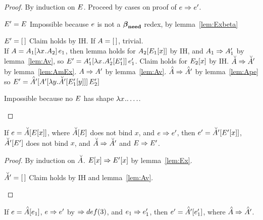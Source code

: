 \documentclass{article}
\begin{document}
\begin{proof}
By induction on $\E$. Proceed by cases on proof of $\e \pstep \e'$.
\begin{byCases}
   $\E' = \E$ 
  Impossible because $\e$ is not a $\betaneednr$ redex, by 
  lemma~\ref{lem:Exbeta} 
  \begin{byCases}
    \renewcommand{\byCasesCaseTemplate}[1]{\textbf{Subcase {#1}.}}
    \case{\E = \hole} $\E' = \hole$
     Claim holds by IH.
    If $\A = \hole$, trivial.\\
    If $\A = \ap{\inA[_1]{\lx\A_2}}{\e_1}$, then lemma holds for 
    $\inA[_2]{\Ex[_1]}$ by IH, and $\A_1 \pstep \A_1'$ by 
    lemma~\ref{lem:Av}, so $\E' = \ap{\inA[_1']{\lx\inA[_2']{\E_1'}}}{\e_1'}$.
    Claim holds for $\Ex[_2]$ by IH. $\Am \pstep \Am'$ by lemma~\ref{lem:AmEx}.
    $\A \pstep \A'$ by lemma~\ref{lem:Av}.
     $\Ap \pstep \Ap'$ by lemma~\ref{lem:Ape} so 
      $\E' = \inAp[']{\ap{\inA[']{\ly\inAm[']{\inE[_1']{y}}}}{\E_2'}}$
  \end{byCases}
  Impossible because no $\E$ has shape $\lx.\ldots$.
\end{byCases}
\end{proof}


\begin{lemma}
\label{lem:AmEx}
If $\e = \inAm{\Ex}$, where $\inAm{\E}$ does not bind $x$, and $\e \pstep \e'$,
then $\e' = \inAm[']{\Ex[']}$, $\inAm[']{\E'}$ does not bind $x$, and $\Am
\pstep \Am'$ and $\E \pstep \E'$.
\end{lemma}

\begin{proof}
By induction on $\Am$. $\Ex \pstep \Ex[']$ by lemma~\ref{lem:Ex}.
\begin{byCases}
  \case{\Am = \hole} $\Am' = \hole$
   Claim holds by IH and lemma~\ref{lem:Av}.
\end{byCases}
\end{proof}


\begin{lemma}
\label{lem:Ape}
If $\e = \inAp{\e_1}$, $\e \pstep \e'$ by $\pstep def(3)$, and $\e_1 \pstep
\e_1'$, then $\e' = \inAp[']{\e_1'}$, where $\Ap \pstep \Ap'$.
\end{lemma}
\end{document}
